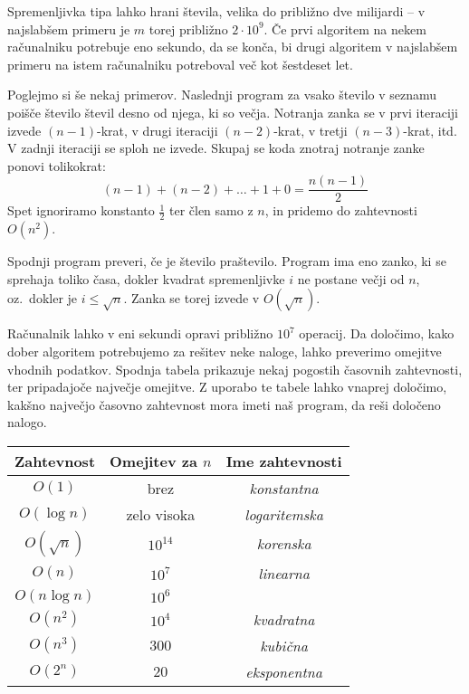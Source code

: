 Spremenljivka tipa  lahko hrani števila, velika do približno dve
milijardi -- v najslabšem primeru je $m$ torej približno $2 \cdot 10^9$.
Če prvi algoritem na nekem računalniku potrebuje eno sekundo, da se konča, bi
drugi algoritem v najslabšem primeru na istem računalniku potreboval več kot
šestdeset let.

Poglejmo si še nekaj primerov.
Naslednji program za vsako število v seznamu  poišče število števil
desno od njega, ki so večja.
Notranja zanka se v prvi iteraciji izvede $(n-1)$-krat, v drugi iteraciji
$(n-2)$-krat, v tretji $(n-3)$-krat, itd.
V zadnji iteraciji se sploh ne izvede.
Skupaj se koda znotraj notranje zanke ponovi tolikokrat:
\[
  (n-1) + (n-2) + \ldots + 1 + 0 = \frac{n(n-1)}{2}
\]
Spet ignoriramo konstanto $\frac{1}{2}$ ter člen samo z $n$, in pridemo do
zahtevnosti $O(n^2)$.


Spodnji program preveri, če je število  praštevilo.
Program ima eno zanko, ki se sprehaja toliko časa, dokler kvadrat spremenljivke
$i$ ne postane večji od $n$, oz.~dokler je $i \le \sqrt{n}$.
Zanka se torej izvede v $O(\sqrt{n})$.



Računalnik lahko v eni sekundi opravi približno $10^7$ operacij.
Da določimo, kako dober algoritem potrebujemo za rešitev neke naloge, lahko
preverimo omejitve vhodnih podatkov.
Spodnja tabela prikazuje nekaj pogostih časovnih zahtevnosti, ter pripadajoče
največje omejitve.
Z uporabo te tabele lahko vnaprej določimo, kakšno največjo časovno zahtevnost
mora imeti naš program, da reši določeno nalogo.

\begin{table}[h!]
  \centering
  \begin{tabular}{|c|c|c|}
	\hline
	Zahtevnost & Omejitev za \(n\) & Ime zahtevnosti \\
	\hline
	$O(1)$ & brez & \emph{konstantna} \\
	$O(\log n)$ & zelo visoka & \emph{logaritemska} \\
	$O(\sqrt{n})$ & $10^{14}$ & \emph{korenska} \\
	$O(n)$ & $10^7$ & \emph{linearna} \\
	$O(n \log n)$ & $10^6$ & \\
	$O(n^2)$ & $10^4$ & \emph{kvadratna} \\
	$O(n^3)$ & $300$ & \emph{kubična} \\
	$O(2^n)$ & $20$ & \emph{eksponentna} \\
	\hline
  \end{tabular}
\end{table}